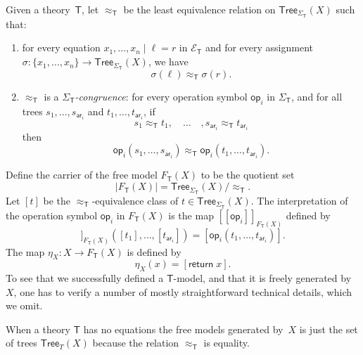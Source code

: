 \documentclass{amsart}
\newcommand{\theory}[1]{\mathsf{#1}} %
\newcommand{\signature}[1]{\Sigma_{\theory{#1}}} %
\newcommand{\equations}[1]{\mathcal{E}_{\theory{#1}}} %
\newcommand{\carrier}[1]{|#1|} %
\newcommand{\Free}[2]{F_{\theory{#1}}(#2)} %
\newcommand{\set}[1]{\{#1\}} %
\newcommand{\Tree}[2]{\mathsf{Tree}_{#1}(#2)} %
\newcommand{\leaf}[1]{\return{#1}} %
\newcommand{\op}[1]{\mathsf{op}_{#1}} %
\newcommand{\arity}[1]{\mathsf{ar}_{#1}} %
\newcommand{\sem}[1]{[\![#1]\!]} %
\newcommand{\kode}[1]{\mathsf{#1}}
\newcommand{\return}[1]{\kode{return}\;#1}
\begin{document}
Given a theory~$\theory{T}$, let $\approx_\theory{T}$ be the least equivalence relation on
$\Tree{\signature{T}}{X}$ such that:
%
\begin{enumerate}
\item for every equation $x_1, \ldots, x_n \mid \ell = r$ in $\equations{T}$ and for every
  assignment $\sigma : \set{x_1, \ldots, x_n} \to \Tree{\signature{T}}{X}$, we have
  \begin{equation*}
    \sigma(\ell) \approx_{\theory{T}} \sigma(r).
  \end{equation*}
\item $\approx_{\theory{T}}$ is a \emph{$\signature{T}$-congruence}: for every
  operation symbol $\op{i}$ in $\signature{T}$, and for all trees
  $s_1, \ldots, s_{\arity{i}}$ and $t_1, \ldots, t_{\arity{i}}$, if
  \begin{equation*}
    s_1 \approx_{\theory{T}} t_1,
    \quad \ldots \quad,
    s_{\arity{i}} \approx_{\theory{T}} t_{\arity{i}}
  \end{equation*}
  then
  \begin{equation*}
    \op{i}(s_1, \ldots, s_{\arity{i}}) \approx_{\theory{T}}
    \op{i}(t_1, \ldots, t_{\arity{i}}).
  \end{equation*}
\end{enumerate}
%
Define the carrier of the free model $\Free{T}{X}$ to be the quotient set
%
\begin{equation*}
  \carrier{\Free{T}{X}} = \Tree{\signature{T}}{X} / {\approx_{\theory{T}}}.
\end{equation*}
%
Let $[t]$ be the $\approx_{\theory{T}}$-equivalence class of
$t \in \Tree{\signature{T}}{X}$. The interpretation of the operation symbol $\op{i}$ in
  $\Free{T}{X}$ is the map $\sem{\op{i}}_{\Free{T}{X}}$ defined by
%
\begin{equation*}
  \sem{\op{i}}_{\Free{T}{X}}([t_1], \ldots, [t_{\arity{i}}]) =
  [\op{i}(t_1, \ldots, t_{\arity{i}})].
\end{equation*}
%
The map $\eta_X : X \to \Free{T}{X}$ is defined by
%
\begin{equation*}
  \eta_X(x) = [\leaf{x}].
\end{equation*}
%
To see that we successfully defined a $\theory{T}$-model, and that it is freely generated
by~$X$, one has to verify a number of mostly straightforward technical details, which we
omit.

When a theory $\theory{T}$ has no equations the free models generated by~$X$ is just the
set of trees $\Tree{T}{X}$ because the relation $\approx_{\theory{T}}$ is equality.
\end{document}
